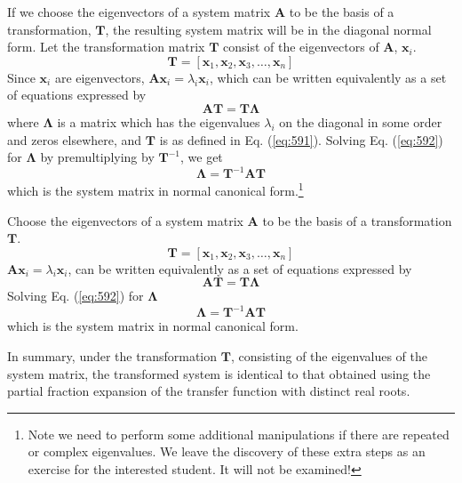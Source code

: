 If we choose the eigenvectors of a system matrix $\mathbf{A}$ to be the basis of a transformation, $\mathbf{T}$, the resulting system matrix will be in the diagonal normal form. Let the transformation matrix $\mathbf{T}$ consist of the eigenvectors of $\mathbf{A}$, $\mathbf{x}_i$.
\begin{equation}\label{eq:591}
	\mathbf{T}=[\mathbf{x}_1, \mathbf{x}_2, \mathbf{x}_3, \ldots, \mathbf{x}_n] 
\end{equation}
Since $\mathbf{x}_i$ are eigenvectors, $\mathbf{A}\mathbf{x}_i=\lambda_i\mathbf{x}_i$, which can be written equivalently as a set of equations expressed by
\begin{equation}\label{eq:592}
	\mathbf{AT}=\mathbf{T\Lambda}
\end{equation}
where $\mathbf{\Lambda}$ is a matrix which has the eigenvalues $\lambda_i$ on the diagonal in some order and zeros elsewhere, and $\mathbf{T}$ is as defined in Eq. (\ref{eq:591}). Solving Eq. (\ref{eq:592}) for $\mathbf{\Lambda}$ by premultiplying by $\mathbf{T}^{-1}$, we get
\begin{equation}\label{eq:593}
	\mathbf{\Lambda}=\mathbf{T}^{-1}\mathbf{AT} 
\end{equation}
which is the system matrix in normal canonical form.\footnote{Note we need to perform some additional manipulations if there are repeated or complex eigenvalues. We leave the discovery of these extra steps as an exercise for the interested student. It will not be examined!}
\ifslidesonly
\begin{slide}
   Choose the eigenvectors of a system matrix $\mathbf{A}$ to be the basis of a transformation $\mathbf{T}$.
\begin{equation}\label{eq:591}
	\mathbf{T}=[\mathbf{x}_1, \mathbf{x}_2, \mathbf{x}_3, \ldots, \mathbf{x}_n] 
\end{equation}
$\mathbf{A}\mathbf{x}_i=\lambda_i\mathbf{x}_i$, can be written equivalently as a set of equations expressed by
\begin{equation}\label{eq:592}
	\mathbf{AT}=\mathbf{T\Lambda}
\end{equation}
Solving Eq. (\ref{eq:592}) for $\mathbf{\Lambda}$
\begin{equation}\label{eq:593}
	\mathbf{\Lambda}=\mathbf{T}^{-1}\mathbf{AT} 
\end{equation}
which is the system matrix in normal canonical form.
\end{slide}
\fi
In summary, under the transformation $\mathbf{T}$, consisting of the eigenvalues of the system matrix, the transformed system is identical to that obtained using the partial fraction expansion of the transfer function with distinct real roots. 

